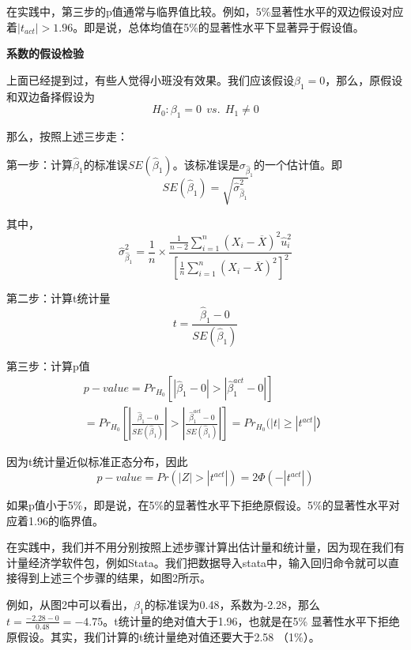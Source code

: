 \documentclass[cn,12pt,math=newtx,citestyle=gb7714-2015,bibstyle=gb7714-2015]{elegantbook}
\begin{document}
	在实践中，第三步的p值通常与临界值比较。例如，5\%显著性水平的双边假设对应着$|t_{act}|>1.96$。即是说，总体均值在5\%的显著性水平下显著异于假设值。
	
	\textbf{系数的假设检验}
	
	上面已经提到过，有些人觉得小班没有效果。我们应该假设$\beta_1=0$，那么，原假设和双边备择假设为
	\begin{equation}
		H_0:\beta_1=0~~vs.~~H_1\neq0
	\end{equation}
	
	那么，按照上述三步走：
	
	第一步：计算$\hat{\beta}_1$的标准误$SE(\hat{\beta}_1)$。该标准误是$\sigma_{\hat{\beta}_1}$的一个估计值。即
	\begin{equation}
		SE(\hat{\beta}_1)=\sqrt{\hat{\sigma}_{\hat{\beta}_1}^2}
	\end{equation}
	
	其中，
	\begin{equation}
		\hat{\sigma}_{\hat{\beta}_1}^2=\frac{1}{n}\times\frac{\frac{1}{n-2}\sum_{i=1}^n{(X_i-\overline{X})^2\hat{u}_i^2}}{[\frac{1}{n}\sum_{i=1}^n{(X_i-\overline{X})^2}]^2}
	\end{equation}
	
	第二步：计算t统计量
	\begin{equation}
		t=\frac{\hat{\beta}_1-0}{SE(\hat{\beta}_1)}
	\end{equation}
	
	第三步：计算p值
	\begin{multline}
		p-value=Pr_{H_0}[|\hat{\beta}_1-0|>|\hat{\beta}_1^{act}-0|]\\
		=Pr_{H_0}[|\frac{\hat{\beta}_1-0}{SE(\hat{\beta}_1)}|>|\frac{\hat{\beta}_1^{act}-0}{SE(\hat{\beta}_1)}|]=Pr_{H_0}(|t|\geq|t^{act}|）
	\end{multline}
	
	因为t统计量近似标准正态分布，因此
	\begin{equation}
		p-value=Pr(|Z|>|t^{act}|)=2\Phi(-|t^{act}|)
	\end{equation}
	
	如果p值小于5\%，即是说，在5\%的显著性水平下拒绝原假设。5\%的显著性水平对应着1.96的临界值。
	
	在实践中，我们并不用分别按照上述步骤计算出估计量和统计量，因为现在我们有计量经济学软件包，例如Stata。我们把数据导入stata中，输入回归命令就可以直接得到上述三个步骤的结果，如图2所示。
	
	例如，从图2中可以看出，$\beta_1$的标准误为0.48，系数为-2.28，那么$t=\frac{-2.28-0}{0.48}=-4.75$。t统计量的绝对值大于1.96，也就是在5\% 显著性水平下拒绝原假设。其实，我们计算的t统计量绝对值还要大于2.58 （1\%）。
	
\end{document}

